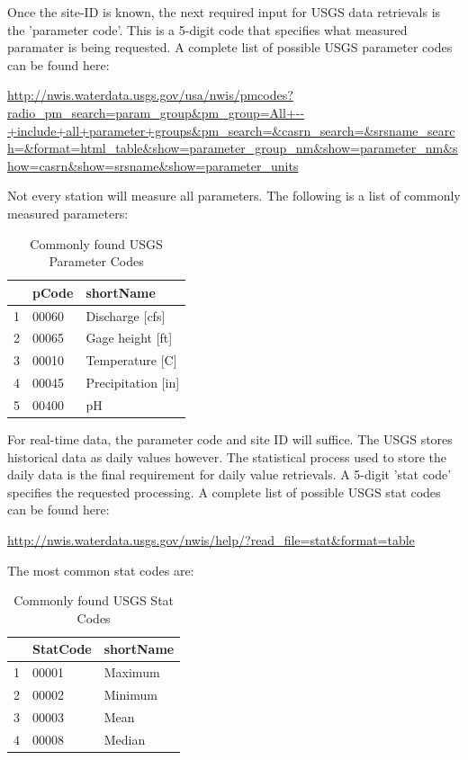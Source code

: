 \documentclass[a4paper,11pt]{article}
\begin{document}
Once the site-ID is known, the next required input for USGS data retrievals is the 'parameter code'.  This is a 5-digit code that specifies what measured paramater is being requested.  A complete list of possible USGS parameter codes can be found here: 

\url{http://nwis.waterdata.usgs.gov/usa/nwis/pmcodes?radio_pm_search=param_group&pm_group=All+--+include+all+parameter+groups&pm_search=&casrn_search=&srsname_search=&format=html_table&show=parameter_group_nm&show=parameter_nm&show=casrn&show=srsname&show=parameter_units}

Not every station will measure all parameters. The following is a list of commonly measured parameters:

\begin{table}[ht]
\begin{center}
\caption{Commonly found USGS Parameter Codes}
\begin{tabular}{rll}
  \hline
 & pCode & shortName \\ 
  \hline
1 & 00060 & Discharge [cfs] \\ 
  2 & 00065 & Gage height [ft] \\ 
  3 & 00010 & Temperature [C] \\ 
  4 & 00045 & Precipitation [in] \\ 
  5 & 00400 & pH \\ 
   \hline
\end{tabular}
\end{center}
\end{table}
For real-time data, the parameter code and site ID will suffice.  The USGS stores historical data as daily values however.  The statistical process used to store the daily data is the final requirement for daily value retrievals.  A 5-digit 'stat code' specifies the requested processing.  A complete list of possible USGS stat codes can be found here:

\url{http://nwis.waterdata.usgs.gov/nwis/help/?read_file=stat&format=table}

The most common stat codes are:
\begin{table}[ht]
\begin{center}
\caption{Commonly found USGS Stat Codes}
\begin{tabular}{rll}
  \hline
 & StatCode & shortName \\ 
  \hline
1 & 00001 & Maximum \\ 
  2 & 00002 & Minimum \\ 
  3 & 00003 & Mean \\ 
  4 & 00008 & Median \\ 
   \hline
\end{tabular}
\end{center}
\end{table}
\end{document}
